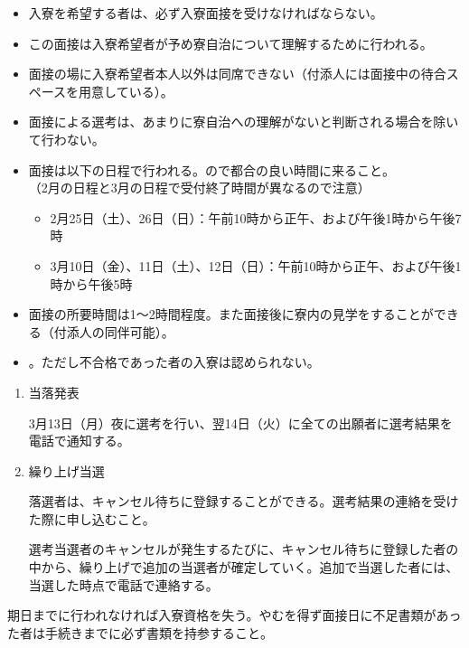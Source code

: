 \newpage

  \begin{itemize}
		\item 入寮を希望する者は、必ず入寮面接を受けなければならない。
    \item この面接は入寮希望者が予め寮自治について理解するために行われる。
    \item 面接の場に入寮希望者本人以外は同席できない（付添人には面接中の待合スペースを用意している）。
    \item 面接による選考は、あまりに寮自治への理解がないと判断される場合を除いて行わない。
    \item 面接は以下の日程で行われる。ので都合の良い時間に来ること。\\
    （2月の日程と3月の日程で受付終了時間が異なるので注意）
      \begin{itemize}
        \item 2月25日（土）、26日（日）：午前10時から正午、および午後1時から午後7時
        \item 3月10日（金）、11日（土）、12日（日）：午前10時から正午、および午後1時から午後5時
      \end{itemize}
    \item 面接の所要時間は1〜2時間程度。また面接後に寮内の見学をすることができる（付添人の同伴可能）。
	  \item {}。ただし不合格であった者の入寮は認められない。
    \end{itemize}
	
		
	\begin{enumerate}
		\item 当落発表

		3月13日（月）夜に選考を行い、翌14日（火）に全ての出願者に選考結果を電話で通知する。
		\item 繰り上げ当選

 		落選者は、キャンセル待ちに登録することができる。選考結果の連絡を受けた際に申し込むこと。

 		選考当選者のキャンセルが発生するたびに、キャンセル待ちに登録した者の中から、繰り上げで追加の当選者が確定していく。追加で当選した者には、当選した時点で電話で連絡する。
	\end{enumerate}

		期日までに行われなければ入寮資格を失う。やむを得ず面接日に不足書類があった者は手続きまでに必ず書類を持参すること。
		
